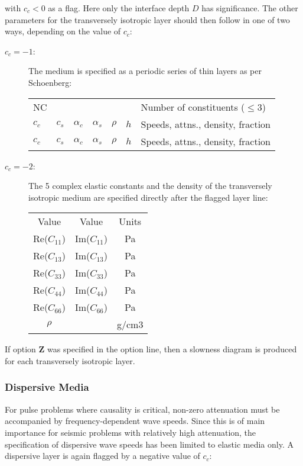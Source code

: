 \noindent with $c_c<0$  as  a  flag.  Here only  the  interface  depth $ D
$ has
significance. The other parameters for the transversely isotropic
layer should then follow in one of two ways, depending on the value
of $c_c$:
\begin{description}
\item[$c_c=-1$:]
          The  medium is specified as a periodic series  of  thin
          layers as per Schoenberg:

	\begin{tabular}{lllllll}
          NC & & & & & &  Number of constituents ($\le 3 $) \\
          $c_c$ & $c_s$ & $\alpha_c$ & $\alpha_s$ &  $\rho$ & $h$ &
                       Speeds, attns., density, fraction \\
          $c_c$ & $c_s$ & $\alpha_c$ & $\alpha_s$ &  $\rho$ & $h$ &
                       Speeds, attns., density, fraction
        \end{tabular}

\item[$c_c = -2$:]
          The 5 complex elastic constants and the density of  the
          transversely  isotropic medium are  specified  directly
          after the flagged layer line:

        \begin{tabular}{ccc}
          Value & Value & Units \\
          Re($C_{11}$) & Im($C_{11}$) &    Pa \\
          Re($C_{13}$) & Im($C_{13}$) &    Pa \\
          Re($C_{33}$) & Im($C_{33}$) &    Pa \\
          Re($C_{44}$) & Im($C_{44}$) &    Pa \\
          Re($C_{66}$) & Im($C_{66}$) &    Pa \\
          $\rho$ & &                       g/cm3
	\end{tabular}
\end{description}
    If option {\bf Z} was specified in the option line, then a slowness
diagram is produced for each transversely isotropic layer.

\subsubsection{Dispersive Media}

For pulse problems where causality is critical, non-zero attenuation
must be accompanied by frequency-dependent wave speeds. Since this is
of main importance for seismic problems with relatively high
attenuation, the specification of dispersive wave speeds has been
limited to elastic media only. A dispersive layer is again flagged by
a negative value of $c_c$:

